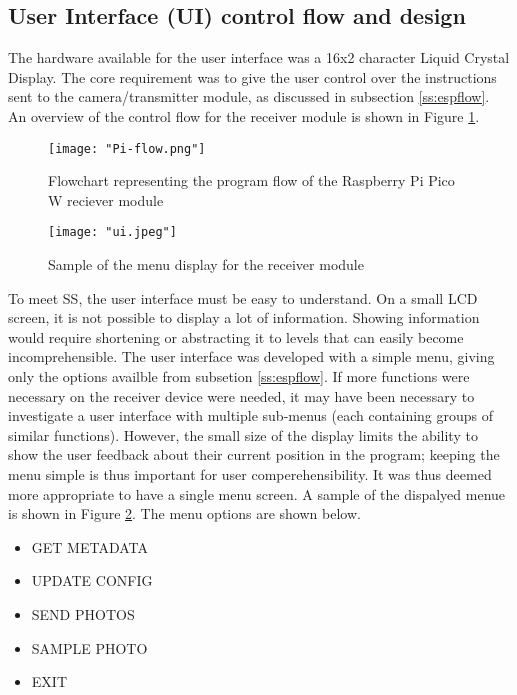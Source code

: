 \documentclass[class=report,11pt,crop=false]{standalone}
\begin{document}
\subsection{User Interface (UI) control flow and design}

The hardware available for the user interface was a 16x2 character Liquid Crystal Display. The core requirement was to give the user control over the instructions sent to the camera/transmitter module, as discussed in subsection \ref{ss:espflow}. An overview of the control flow for the receiver module is shown in Figure \ref{fig:piflow}.

\begin{figure}[ht]
    \centering
    \texttt{[image: "Pi-flow.png"]}
    \caption{Flowchart representing the program flow of the Raspberry Pi Pico W reciever module}
    \label{fig:piflow}
\end{figure}

\begin{figure}[ht]
    \centering
    \texttt{[image: "ui.jpeg"]}
    \caption{Sample of the menu display for the receiver module}
    \label{fig:uisample}
\end{figure}

To meet SS, the user interface must be easy to understand. On a small LCD screen, it is not possible to display a lot of information. Showing information would require shortening or abstracting it to levels that can easily become incomprehensible.  The user interface was developed with a simple menu, giving only the options availble from subsetion \ref{ss:espflow}. If more functions were necessary on the receiver device were needed, it may have been necessary to investigate a user interface with multiple sub-menus (each containing groups of similar functions). However, the small size of the display limits the ability to show the user feedback about their current position in the program; keeping the menu simple is thus important for user comperehensibility. It was thus deemed more appropriate to have a single menu screen. A sample of the dispalyed menue is shown in Figure \ref{fig:uisample}. The menu options are shown below. 
\begin{itemize}
    \item GET METADATA
    \item UPDATE CONFIG
    \item SEND PHOTOS
    \item SAMPLE PHOTO
    \item EXIT
\end{itemize}
\end{document}
